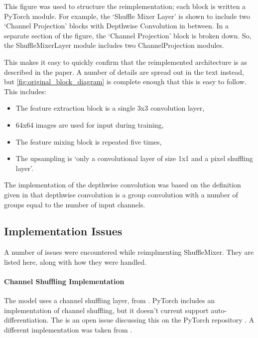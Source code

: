 \documentclass{article}
\begin{document}
    This figure was used to structure the reimplementation; each block is written a PyTorch module. For example, the `Shuffle Mixer Layer' is shown to include two `Channel Projection' blocks with Depthwise Convolution in between. In a separate section of the figure, the `Channel Projection' block is broken down. So, the ShuffleMixerLayer module includes two ChannelProjection modules.

    This makes it easy to quickly confirm that the reimplemented architecture is as described in the paper. A number of details are spread out in the text instead, but \cref{fig:original_block_diagram} is complete enough that this is easy to follow. This includes:

    \begin{itemize}
        \item The feature extraction block is a single 3x3 convolution layer,
        \item 64x64 images are used for input during training,
        \item The feature mixing block is repeated five times,
        \item The upsampling is `only a convolutional layer of size 1x1 and a pixel shuffling layer'.
    \end{itemize}

    The implementation of the depthwise convolution was based on the definition given in \citet{liu2022convnet} that depthwise convolution is a group convolution with a number of groups equal to the number of input channels.

    \subsection{Implementation Issues} \label{sec: imp issues}

    A number of issues were encountered while reimplmenting ShuffleMixer. They are listed here, along with how they were handled.

    \paragraph{Channel Shuffling Implementation} The model uses a channel shuffling layer, from \citet{zhang2017shufflenet}. PyTorch includes an implementation of channel shuffling, but it doesn't current support auto-differentiation. The is an open issue discussing this on the PyTorch repository \citep{PytorchChannelShuffleIssueGithub}. A different implementation was taken from \citet{KuangliuGitHub}.
\end{document}

